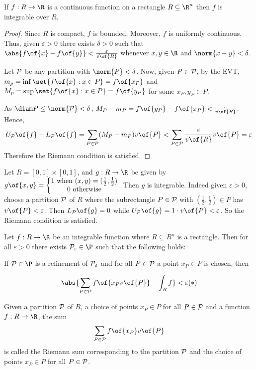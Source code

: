 \begin{corollary}
    If $f: R \to \R$ is a continuous function on a rectangle $R \subseteq \R^n$ then $f$ is integrable over $R$.
\end{corollary}
\begin{proof}
    Since $R$ is compact, $f$ is bounded. Moreover, $f$ is uniformly continuous. Thus, given $\varepsilon > 0$ there exists $\delta > 0$ such that $\abs{f\of{x} - f\of{y}} < \frac{\varepsilon}{v\of{R}}$ whenever $x,y \in \R$ and $\norm{x - y} < \delta$.

    Let $\cal{P}$ be any partition with $\norm{P} < \delta$. Now, given $P \in \cal{P}$, by the EVT, $m_p = \inf \set{f\of{x}: x \in P} = f\of{x_P}$ and $M_p = \sup \set{f\of{x}: x \in P} = f\of{y_P}$ for some $x_P, y_P \in P$.

    As $\diam P \leq \norm{\cal{P}} < \delta$, $M_P - m_P = f\of{y_P} - f\of{x_P} < \frac{\varepsilon}{v\of{R}}$.
    Hence,
    \[U_{\cal{P}}\of{f} - L_{\cal{P}}\of{f} = \sum_{P \in \cal{P}} (M_P - m_P) v\of{P} < \sum_{P \in \cal{P}} \frac{\varepsilon}{v\of{R}}v\of{P} = \varepsilon\]
    Therefore the Riemann condition is satisfied.
\end{proof}

\begin{example}
    Let $R = [0,1] \times [0,1]$, and $g: R \to \R$ be given by $g\of{x,y} = \left\{\begin{matrix} 1 \text{ when } (x,y) = (\frac{1}{2}, \frac{1}{2}) \\ 0 \text{ otherwise} \end{matrix}\right.$.
    Then $g$ is integrable. Indeed given $\varepsilon > 0$, choose a partition $\cal{P}$ of $R$ where the subrectangle $P \in \cal{P}$ with $(\frac{1}{2},\frac{1}{2}) \in P$ has $v\of{P} < \varepsilon$. Then $L_{\cal{P}}\of{g} = 0$ while $U_{\cal{P}}\of{g} = 1 \cdot v\of{P} < \varepsilon$. So the Riemann condition is satisfied.
\end{example}

\begin{theorem}
    Let $f: R \to \R$ be an integrable function where $R \subseteq R^n$ is a rectangle. Then for all $\varepsilon > 0$ there exists $\cal{P}_\varepsilon \in \P$ such that the following holds:
    
    If $\cal{P} \in \P$ is a refinement of $\cal{P}_\varepsilon$ and for all $P \in \cal{P}$ a point $x_P \in P$ is chosen, then

    \[\abs{\sum_{P \in \cal{P}} f\of{x_P v\of{P}} - \int_R f} < \varepsilon (*)\]
\end{theorem}

\begin{definition}
    Given a partition $\cal{P}$ of $R$, a choice of points $x_P \in P$ for all $P \in \cal{P}$ and a function $f: R \to \R$, the sum
    \[\sum_{P \in \cal{P}} f\of{x_P} v\of{P}\]
    is called the Riemann sum corresponding to the partition $\cal{P}$ and the choice of points $x_P \in P$ for all $P \in \cal{P}$.
\end{definition}
